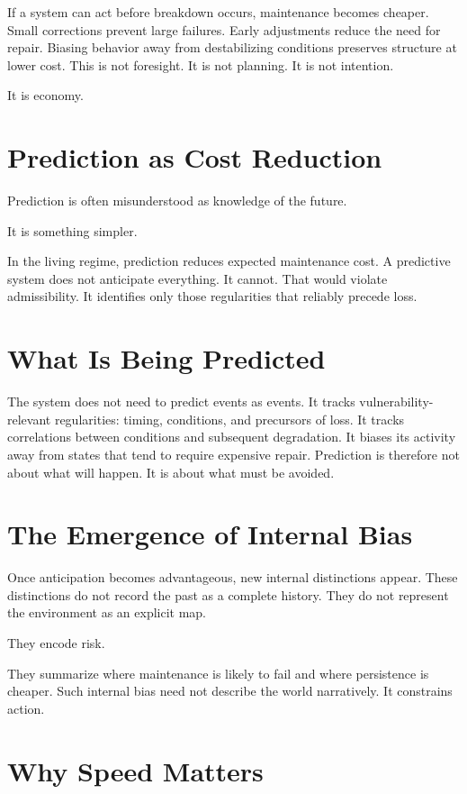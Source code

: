\documentclass[11pt,twoside,openright]{book}
\begin{document}
If a system can act before breakdown occurs, maintenance becomes cheaper. Small corrections prevent large failures. Early adjustments reduce the need for repair. Biasing behavior away from destabilizing conditions preserves structure at lower cost. This is not foresight. It is not planning. It is not intention.

It is economy.

\section*{Prediction as Cost Reduction}

Prediction is often misunderstood as knowledge of the future.

It is something simpler.

In the living regime, prediction reduces expected maintenance cost. A predictive system does not anticipate everything. It cannot. That would violate admissibility. It identifies only those regularities that reliably precede loss.



\section*{What Is Being Predicted}

The system does not need to predict events as events. It tracks vulnerability-relevant regularities: timing, conditions, and precursors of loss. It tracks correlations between conditions and subsequent degradation. It biases its activity away from states that tend to require expensive repair. Prediction is therefore not about what will happen. It is about what must be avoided.

\section*{The Emergence of Internal Bias}

Once anticipation becomes advantageous, new internal distinctions appear. These distinctions do not record the past as a complete history. They do not represent the environment as an explicit map.

They encode risk.

They summarize where maintenance is likely to fail and where persistence is cheaper. Such internal bias need not describe the world narratively. It constrains action.

\section*{Why Speed Matters}
\end{document}
